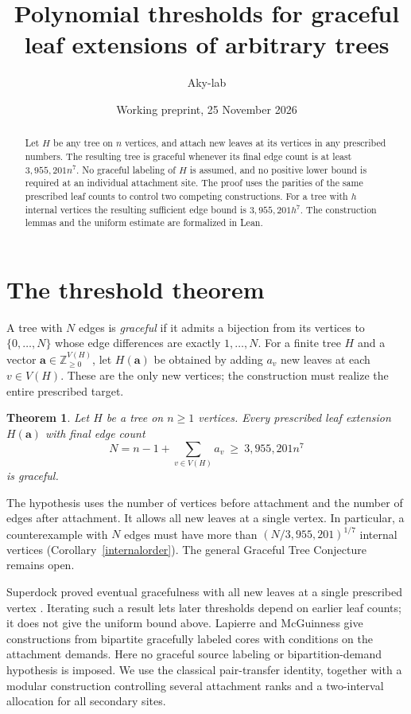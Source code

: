 \documentclass[11pt]{article}
\title{Polynomial thresholds for graceful leaf extensions of arbitrary trees}
\author{Aky-lab}\date{Working preprint, 25 November 2026}
\newtheorem{theorem}{Theorem}
\begin{document}
\maketitle
\begin{abstract}
Let $H$ be any tree on $n$ vertices, and attach new leaves at its vertices
in any prescribed numbers. The resulting tree is graceful whenever its
final edge count is at least $3{,}955{,}201 n^7$. No graceful labeling of
$H$ is assumed, and no positive lower bound is required at an individual
attachment site. The proof uses the parities of the same prescribed leaf counts to
control two competing constructions. For a tree with $h$ internal
vertices the resulting sufficient edge bound is $3{,}955{,}201h^7$.
The construction lemmas and the uniform estimate are formalized in Lean.
\end{abstract}
\section{The threshold theorem}
A tree with $N$ edges is \emph{graceful} if it admits a bijection from
its vertices to $\{0,\ldots,N\}$ whose edge differences are exactly
$1,\ldots,N$. For a finite tree $H$ and a vector
$\mathbf a\in\mathbb Z_{\ge0}^{V(H)}$, let $H(\mathbf a)$ be obtained
by adding $a_v$ new leaves at each $v\in V(H)$. These are the only new
vertices; the construction must realize the entire prescribed target.
\begin{theorem}\label{poly}
Let $H$ be a tree on $n\ge1$ vertices. Every prescribed leaf extension
$H(\mathbf a)$ with final edge count
\[
 N=n-1+\sum_{v\in V(H)}a_v\ \ge\ 3{,}955{,}201n^7
\]
is graceful.
\end{theorem}
The hypothesis uses the number of vertices before attachment and the number
of edges after attachment. It allows all new leaves at a single vertex.
In particular, a counterexample with $N$ edges must have more than
$(N/3{,}955{,}201)^{1/7}$ internal vertices (Corollary~\ref{internalorder}).
The general Graceful Tree Conjecture remains open.

Superdock proved eventual gracefulness with all new leaves at a single
prescribed vertex \cite[Corollary 5.10]{S}. Iterating such a result lets
later thresholds depend on earlier leaf counts; it does not give the
uniform bound above. Lapierre and McGuinness \cite[Theorem 1.2 and
Corollary 1.3]{LM} give constructions from bipartite gracefully labeled
cores with conditions on the attachment demands. Here no graceful
source labeling or bipartition-demand hypothesis is imposed.
We use the classical pair-transfer identity, together with a modular
construction controlling several attachment ranks and a two-interval
allocation for all secondary sites.
\end{document}

